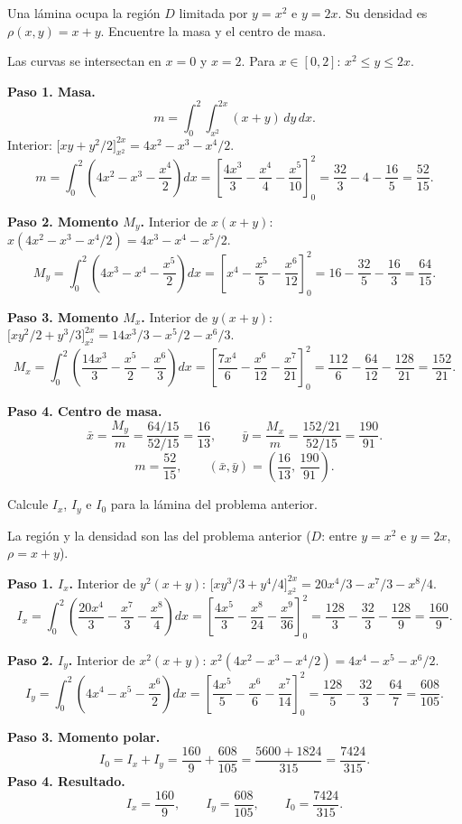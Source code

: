 \begin{prob}
Una lámina ocupa la región \(D\) limitada por \(y=x^2\) e \(y=2x\). Su densidad es \(\rho(x,y)=x+y\). Encuentre la masa y el centro de masa.
\begin{myproof}
Las curvas se intersectan en $x=0$ y $x=2$. Para $x\in[0,2]$: $x^2\le y\le 2x$.

\textbf{Paso 1. Masa.}
\[
m=\int_0^2\int_{x^2}^{2x}(x+y)\,dy\,dx.
\]
Interior: $\bigl[xy+y^2/2\bigr]_{x^2}^{2x}=4x^2-x^3-x^4/2$.
\[
m=\int_0^2\!\left(4x^2-x^3-\frac{x^4}{2}\right)dx
=\left[\frac{4x^3}{3}-\frac{x^4}{4}-\frac{x^5}{10}\right]_0^2
=\frac{32}{3}-4-\frac{16}{5}=\frac{52}{15}.
\]

\textbf{Paso 2. Momento $M_y$.}
Interior de $x(x+y)$: $x(4x^2-x^3-x^4/2)=4x^3-x^4-x^5/2$.
\[
M_y=\int_0^2\!\left(4x^3-x^4-\frac{x^5}{2}\right)dx
=\left[x^4-\frac{x^5}{5}-\frac{x^6}{12}\right]_0^2
=16-\frac{32}{5}-\frac{16}{3}=\frac{64}{15}.
\]

\textbf{Paso 3. Momento $M_x$.}
Interior de $y(x+y)$: $\bigl[xy^2/2+y^3/3\bigr]_{x^2}^{2x}=14x^3/3-x^5/2-x^6/3$.
\[
M_x=\int_0^2\!\left(\frac{14x^3}{3}-\frac{x^5}{2}-\frac{x^6}{3}\right)dx
=\left[\frac{7x^4}{6}-\frac{x^6}{12}-\frac{x^7}{21}\right]_0^2
=\frac{112}{6}-\frac{64}{12}-\frac{128}{21}=\frac{152}{21}.
\]

\textbf{Paso 4. Centro de masa.}
\[
\bar{x}=\frac{M_y}{m}=\frac{64/15}{52/15}=\frac{16}{13},\qquad
\bar{y}=\frac{M_x}{m}=\frac{152/21}{52/15}=\frac{190}{91}.
\]
\[
\boxed{m=\frac{52}{15},\qquad (\bar{x},\bar{y})=\left(\frac{16}{13},\,\frac{190}{91}\right).}
\]
\end{myproof}
\end{prob}

\begin{prob}
Calcule \(I_x\), \(I_y\) e \(I_0\) para la lámina del problema anterior.
\begin{myproof}
La región y la densidad son las del problema anterior ($D$: entre $y=x^2$ e $y=2x$, $\rho=x+y$).

\textbf{Paso 1. $I_x$.}
Interior de $y^2(x+y)$: $\bigl[xy^3/3+y^4/4\bigr]_{x^2}^{2x}=20x^4/3-x^7/3-x^8/4$.
\[
I_x=\int_0^2\!\left(\frac{20x^4}{3}-\frac{x^7}{3}-\frac{x^8}{4}\right)dx
=\left[\frac{4x^5}{3}-\frac{x^8}{24}-\frac{x^9}{36}\right]_0^2
=\frac{128}{3}-\frac{32}{3}-\frac{128}{9}=\frac{160}{9}.
\]

\textbf{Paso 2. $I_y$.}
Interior de $x^2(x+y)$: $x^2(4x^2-x^3-x^4/2)=4x^4-x^5-x^6/2$.
\[
I_y=\int_0^2\!\left(4x^4-x^5-\frac{x^6}{2}\right)dx
=\left[\frac{4x^5}{5}-\frac{x^6}{6}-\frac{x^7}{14}\right]_0^2
=\frac{128}{5}-\frac{32}{3}-\frac{64}{7}=\frac{608}{105}.
\]

\textbf{Paso 3. Momento polar.}
\[
I_0=I_x+I_y=\frac{160}{9}+\frac{608}{105}=\frac{5600+1824}{315}=\frac{7424}{315}.
\]
\textbf{Paso 4. Resultado.}
\[
\boxed{I_x=\frac{160}{9},\qquad I_y=\frac{608}{105},\qquad I_0=\frac{7424}{315}.}
\]
\end{myproof}
\end{prob}

